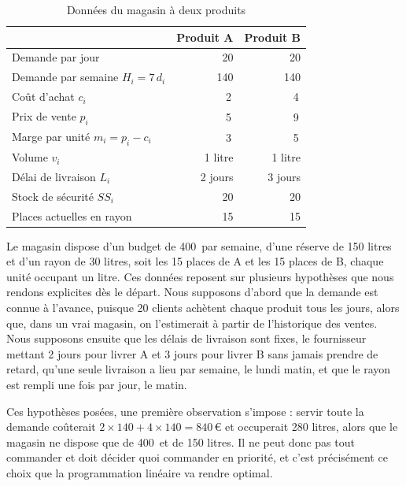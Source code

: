 \documentclass[11pt,a4paper]{article}
\newcommand{\eur}{\,\text{€}}
\begin{document}
\begin{table}[!htbp]
\centering\small
\caption{Données du magasin à deux produits}\label{tab:donnees2}
\begin{tabular}{@{}lrr@{}}
\toprule
 & Produit A & Produit B \\
\midrule
Demande par jour & 20 & 20 \\
Demande par semaine $H_i = 7\,d_i$ & 140 & 140 \\
Coût d'achat $c_i$ & 2\eur & 4\eur \\
Prix de vente $p_i$ & 5\eur & 9\eur \\
Marge par unité $m_i = p_i - c_i$ & 3\eur & 5\eur \\
Volume $v_i$ & 1 litre & 1 litre \\
Délai de livraison $L_i$ & 2 jours & 3 jours \\
Stock de sécurité $SS_i$ & 20 & 20 \\
Places actuelles en rayon & 15 & 15 \\
\bottomrule
\end{tabular}
\end{table}

Le magasin dispose d'un budget de 400\eur{} par semaine, d'une réserve de 150 litres et d'un
rayon de 30 litres, soit les 15 places de A et les 15 places de B, chaque unité occupant un
litre. Ces données reposent sur plusieurs hypothèses que nous rendons explicites dès le
départ. Nous supposons d'abord que la demande est connue à l'avance, puisque 20 clients
achètent chaque produit tous les jours, alors que, dans un vrai magasin, on l'estimerait à
partir de l'historique des ventes. Nous supposons ensuite que les délais de livraison sont
fixes, le fournisseur mettant 2 jours pour livrer A et 3 jours pour livrer B sans jamais
prendre de retard, qu'une seule livraison a lieu par semaine, le lundi matin, et que le rayon
est rempli une fois par jour, le matin.

Ces hypothèses posées, une première observation s'impose : servir toute la demande coûterait
$2 \times 140 + 4 \times 140 = 840\eur$ et occuperait 280 litres, alors que le magasin ne
dispose que de 400\eur{} et de 150 litres. Il ne peut donc pas tout commander et doit décider
quoi commander en priorité, et c'est précisément ce choix que la programmation linéaire va
rendre optimal.
\end{document}
